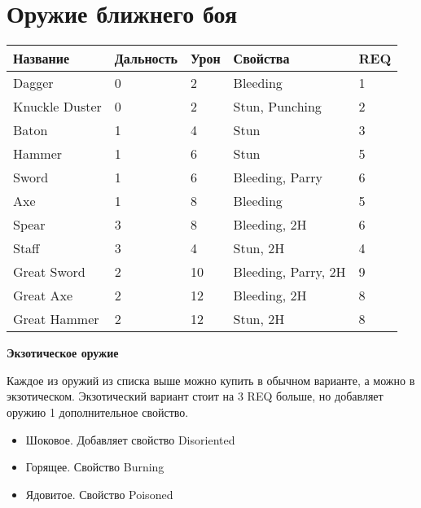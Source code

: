 \section*{Оружие ближнего боя}
    \begin{table}[H]
        \centering
        \begin{tabular}{|l|l|l|l|l|}
            \hline
            Название       & Дальность & Урон & Свойства             & REQ \\ \hline
            Dagger         & 0         & 2    & Bleeding             & 1   \\ \hline
            Knuckle Duster & 0         & 2    & Stun, Punching       & 2   \\ \hline
            Baton          & 1         & 4    & Stun                 & 3   \\ \hline
            Hammer         & 1         & 6    & Stun                 & 5   \\ \hline
            Sword          & 1         & 6    & Bleeding, Parry      & 6   \\ \hline
            Axe            & 1         & 8    & Bleeding             & 5   \\ \hline
            Spear          & 3         & 8    & Bleeding, 2H         & 6   \\ \hline
            Staff          & 3         & 4    & Stun, 2H             & 4   \\ \hline
            Great Sword    & 2         & 10   & Bleeding, Parry, 2H & 9   \\ \hline
            Great Axe      & 2         & 12   & Bleeding, 2H         & 8   \\ \hline
            Great Hammer    & 2         & 12   & Stun, 2H             & 8   \\ \hline
        \end{tabular}
    \end{table}

\textbf{Экзотическое оружие}

Каждое из оружий из списка выше можно купить в обычном варианте, а можно в экзотическом. Экзотический вариант стоит на 3 REQ больше, но
добавляет оружию 1 дополнительное свойство.

\begin{itemize}
    \item Шоковое. Добавляет свойство Disoriented
    \item Горящее. Свойство Burning
    \item Ядовитое. Свойство Poisoned
\end{itemize}